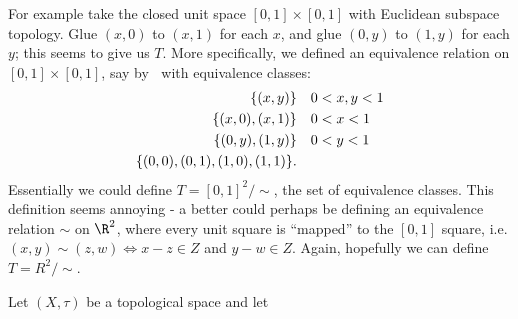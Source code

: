 For example take the closed unit space $[0,1]\times[0,1]$ with Euclidean subspace topology. Glue $(x,0)$ to $(x,1)$ for each $x$, and glue $(0,y)$ to $(1,y)$ for each $y$; this seems to give us $T$. More specifically, we defined an equivalence relation on $[0,1]\times[0,1]$, say by $~$ with equivalence classes: 
\begin{align*}
    \{(x,y)\} & \quad 0<x,y<1\\
    \{(x,0),(x,1)\} & \quad 0<x<1\\
    \{(0,y),(1,y)\} & \quad 0<y<1\\
    \{(0,0), (0,1), (1,0), (1,1)\}.
\end{align*}
Essentially we could define $T = [0,1]^2 / \sim$, the set of equivalence classes. This definition seems annoying - a better could perhaps be defining an equivalence relation $\sim$ on $\R^2$, where every unit square is ``mapped'' to the $[0,1]$ square, i.e. $(x,y)\sim(z,w) \Leftrightarrow x-z\in Z$ and $y-w\in Z$. Again, hopefully we can define $T = R^2/ \sim$.
\begin{definition}
Let $(X,\tau)$ be a topological space and let
\end{definition}